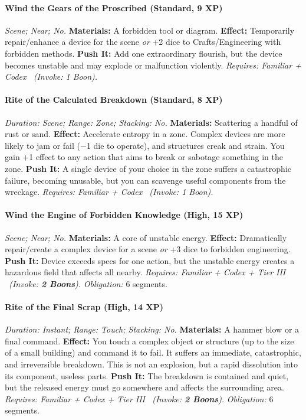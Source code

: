 \documentclass[12pt,twoside]{book}
\begin{document}
\paragraph{Wind the Gears of the Proscribed (Standard, 9 XP)} \emph{Scene; Near; No.}
\textbf{Materials:} A forbidden tool or diagram.
\textbf{Effect:} Temporarily repair/enhance a device for the scene \emph{or} +2 dice to Crafts/Engineering with forbidden methods.
\textbf{Push It:} Add one extraordinary flourish, but the device becomes unstable and may explode or malfunction violently.
\emph{Requires: Familiar + Codex \ (\textit{Invoke:} 1 Boon).}
\paragraph{Rite of the Calculated Breakdown (Standard, 8 XP)} \emph{Duration: Scene; Range: Zone; Stacking: No.}
\textbf{Materials:} Scattering a handful of rust or sand.
\textbf{Effect:} Accelerate entropy in a zone. Complex devices are more likely to jam or fail (−1 die to operate), and structures creak and strain. You gain +1 effect to any action that aims to break or sabotage something in the zone.
\textbf{Push It:} A single device of your choice in the zone suffers a catastrophic failure, becoming unusable, but you can scavenge useful components from the wreckage.
\emph{Requires: Familiar + Codex \ (\textit{Invoke:} 1 Boon).}
\paragraph{Wind the Engine of Forbidden Knowledge (High, 15 XP)} \emph{Scene; Near; No.}
\textbf{Materials:} A core of unstable energy.
\textbf{Effect:} Dramatically repair/create a complex device for a scene \emph{or} +3 dice to forbidden engineering.
\textbf{Push It:} Device exceeds specs for one action, but the unstable energy creates a hazardous field that affects all nearby.
\emph{Requires: Familiar + Codex + Tier III \ (\textit{Invoke:} \textbf{2 Boons}).}
\emph{Obligation:} 6 segments.

\paragraph{Rite of the Final Scrap (High, 14 XP)} \emph{Duration: Instant; Range: Touch; Stacking: No.}
\textbf{Materials:} A hammer blow or a final command.
\textbf{Effect:} You touch a complex object or structure (up to the size of a small building) and command it to fail. It suffers an immediate, catastrophic, and irreversible breakdown. This is not an explosion, but a rapid dissolution into its component, useless parts.
\textbf{Push It:} The breakdown is contained and quiet, but the released energy must go somewhere and affects the surrounding area.
\emph{Requires: Familiar + Codex + Tier III \ (\textit{Invoke:} \textbf{2 Boons}).}
\emph{Obligation:} 6 segments.
\end{document}

